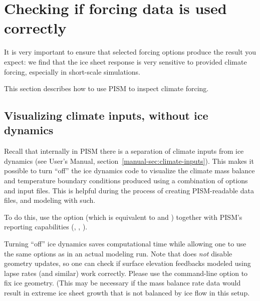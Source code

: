 \documentclass[titlepage,letterpaper,final]{scrartcl}
\begin{document}
\section{Checking if forcing data is used correctly}
\label{sec:checking-forcing}

It is very important to ensure that selected forcing options produce the result you expect: we find that the ice sheet response is very sensitive to provided climate forcing, especially in short-scale simulations.

This section describes how to use PISM to inspect climate forcing.

\subsection{Visualizing climate inputs, without ice dynamics}
\label{sec:visualize-climate}

Recall that internally in PISM there is a separation of climate inputs from ice dynamics (see User's Manual, section~\ref*{manual-sec:climate-inputs}). This makes it possible to turn ``off'' the ice dynamics code to visualize the climate mass balance and temperature boundary conditions produced using a combination of options and input files. This is helpful during the process of creating PISM-readable data files, and modeling with such.

To do this, use the option  (which is equivalent to  and ) together with PISM's reporting capabilities (, , ).

Turning ``off'' ice dynamics saves computational time while allowing one to use the same options as in an actual modeling run. Note that  does \emph{not} disable geometry updates, so one can check if surface elevation feedbacks modeled using lapse rates (and similar) work correctly. Please use the  command-line option to fix ice geometry. (This may be necessary if the mass balance rate data would result in extreme ice sheet growth that is not balanced by ice flow in this setup.
\end{document}
